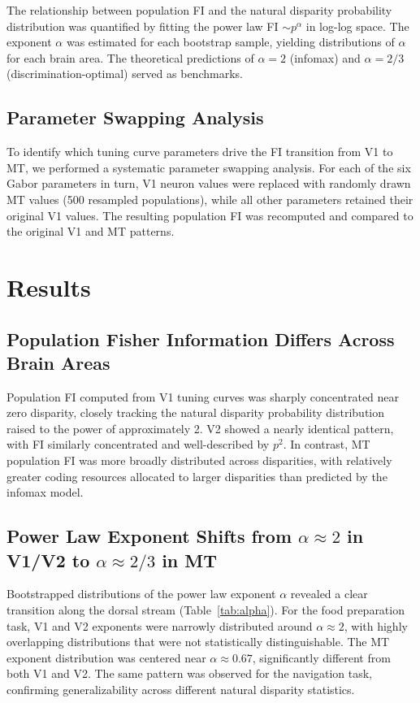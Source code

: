 \documentclass[12pt]{article}
\begin{document}
The relationship between population FI and the natural disparity probability distribution was quantified by fitting the power law FI $\sim p^{\alpha}$ in log-log space. The exponent $\alpha$ was estimated for each bootstrap sample, yielding distributions of $\alpha$ for each brain area. The theoretical predictions of $\alpha = 2$ (infomax) and $\alpha = 2/3$ (discrimination-optimal) served as benchmarks.

\subsection{Parameter Swapping Analysis}

To identify which tuning curve parameters drive the FI transition from V1 to MT, we performed a systematic parameter swapping analysis. For each of the six Gabor parameters in turn, V1 neuron values were replaced with randomly drawn MT values (500 resampled populations), while all other parameters retained their original V1 values. The resulting population FI was recomputed and compared to the original V1 and MT patterns.

\section{Results}

\subsection{Population Fisher Information Differs Across Brain Areas}

Population FI computed from V1 tuning curves was sharply concentrated near zero disparity, closely tracking the natural disparity probability distribution raised to the power of approximately 2. V2 showed a nearly identical pattern, with FI similarly concentrated and well-described by $p^{2}$. In contrast, MT population FI was more broadly distributed across disparities, with relatively greater coding resources allocated to larger disparities than predicted by the infomax model.

\subsection{Power Law Exponent Shifts from $\alpha \approx 2$ in V1/V2 to $\alpha \approx 2/3$ in MT}

Bootstrapped distributions of the power law exponent $\alpha$ revealed a clear transition along the dorsal stream (Table~\ref{tab:alpha}). For the food preparation task, V1 and V2 exponents were narrowly distributed around $\alpha \approx 2$, with highly overlapping distributions that were not statistically distinguishable. The MT exponent distribution was centered near $\alpha \approx 0.67$, significantly different from both V1 and V2. The same pattern was observed for the navigation task, confirming generalizability across different natural disparity statistics.
\end{document}
